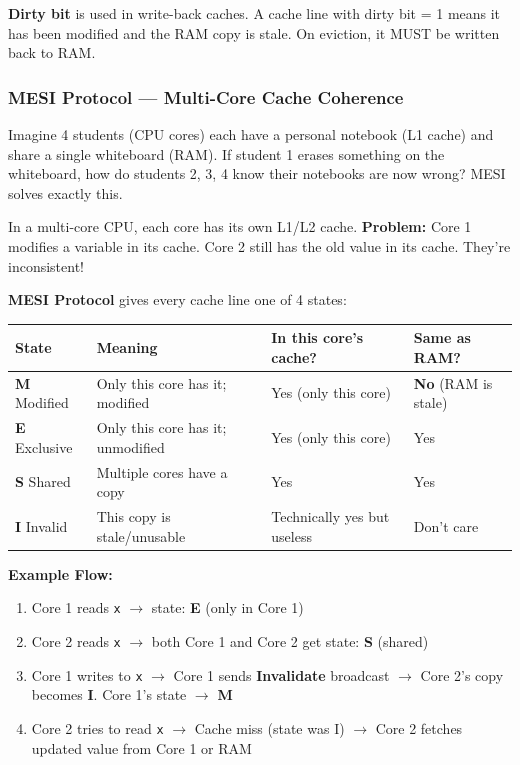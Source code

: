 \documentclass[11pt,a4paper]{article}
\newcommand{\code}[1]{\texttt{\small\colorbox{codebg}{\color{codekw}#1}}}
\newcommand{\term}[1]{\textbf{\color{darkblue}#1}}
\begin{document}
\begin{keypoint}
\textbf{Dirty bit} is used in write-back caches. A cache line with dirty bit = 1 means it has been modified and the RAM copy is stale. On eviction, it MUST be written back to RAM.
\end{keypoint}

\subsubsection{MESI Protocol --- Multi-Core Cache Coherence}

\begin{analogy}
Imagine 4 students (CPU cores) each have a personal notebook (L1 cache) and share a single whiteboard (RAM). If student 1 erases something on the whiteboard, how do students 2, 3, 4 know their notebooks are now wrong? MESI solves exactly this.
\end{analogy}

In a multi-core CPU, each core has its own L1/L2 cache. \textbf{Problem:} Core 1 modifies a variable in its cache. Core 2 still has the old value in its cache. They're inconsistent!

\term{MESI Protocol} gives every cache line one of 4 states:

\begin{center}
\begin{tabular}{C{1.5cm} L{4cm} L{4cm} L{4cm}}
\toprule
\textbf{State} & \textbf{Meaning} & \textbf{In this core's cache?} & \textbf{Same as RAM?} \\
\midrule
\textbf{M} Modified  & Only this core has it; modified & Yes (only this core) & \textbf{No} (RAM is stale) \\
\textbf{E} Exclusive & Only this core has it; unmodified & Yes (only this core) & Yes \\
\textbf{S} Shared    & Multiple cores have a copy & Yes & Yes \\
\textbf{I} Invalid   & This copy is stale/unusable & Technically yes but useless & Don't care \\
\bottomrule
\end{tabular}
\end{center}

\textbf{Example Flow:}
\begin{enumerate}[noitemsep]
  \item Core 1 reads \code{x} $\to$ state: \textbf{E} (only in Core 1)
  \item Core 2 reads \code{x} $\to$ both Core 1 and Core 2 get state: \textbf{S} (shared)
  \item Core 1 writes to \code{x} $\to$ Core 1 sends \textbf{Invalidate} broadcast $\to$ Core 2's copy becomes \textbf{I}. Core 1's state $\to$ \textbf{M}
  \item Core 2 tries to read \code{x} $\to$ Cache miss (state was I) $\to$ Core 2 fetches updated value from Core 1 or RAM
\end{enumerate}
\end{document}
